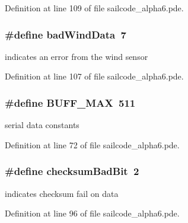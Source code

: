 \-Definition at line 109 of file sailcode\-\_\-alpha6.\-pde.

\hypertarget{group__globalconstants_ga55cee1ec4df41dd9b7b71c6aa9619bfc}{
\subsubsection[{bad\-Wind\-Data}]{\setlength{\rightskip}{0pt plus 5cm}\#define bad\-Wind\-Data~7}}
\label{group__globalconstants_ga55cee1ec4df41dd9b7b71c6aa9619bfc}


indicates an error from the wind sensor 



\-Definition at line 107 of file sailcode\-\_\-alpha6.\-pde.

\hypertarget{group__globalconstants_ga2c1c653e45c4962f05cb6341f359707d}{
\subsubsection[{\-B\-U\-F\-F\-\_\-\-M\-A\-X}]{\setlength{\rightskip}{0pt plus 5cm}\#define \-B\-U\-F\-F\-\_\-\-M\-A\-X~511}}
\label{group__globalconstants_ga2c1c653e45c4962f05cb6341f359707d}


serial data constants 



\-Definition at line 72 of file sailcode\-\_\-alpha6.\-pde.

\hypertarget{group__globalconstants_gacd110736362ec97d7349dd67b527df39}{
\subsubsection[{checksum\-Bad\-Bit}]{\setlength{\rightskip}{0pt plus 5cm}\#define checksum\-Bad\-Bit~2}}
\label{group__globalconstants_gacd110736362ec97d7349dd67b527df39}


indicates checksum fail on data 



\-Definition at line 96 of file sailcode\-\_\-alpha6.\-pde.

